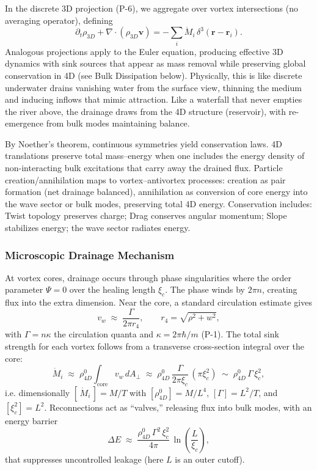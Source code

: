 In the discrete 3D projection (P-6), we aggregate over vortex intersections (no averaging operator), defining
\begin{equation}
\partial_t \rho_{3D} + \nabla \!\cdot (\rho_{3D}\mathbf{v}) = -\sum_i \dot{M}_i\,\delta^3(\mathbf{r}-\mathbf{r}_i).
\end{equation}
Analogous projections apply to the Euler equation, producing effective 3D dynamics with sink sources that appear as mass removal while preserving global conservation in 4D (see Bulk Dissipation below). Physically, this is like discrete underwater drains vanishing water from the surface view, thinning the medium and inducing inflows that mimic attraction. Like a waterfall that never empties the river above, the drainage draws from the 4D structure (reservoir), with re-emergence from bulk modes maintaining balance.

By Noether's theorem, continuous symmetries yield conservation laws. 4D translations preserve total mass–energy when one includes the energy density of non-interacting bulk excitations that carry away the drained flux. Particle creation/annihilation maps to vortex–antivortex processes: creation as pair formation (net drainage balanced), annihilation as conversion of core energy into the wave sector or bulk modes, preserving total 4D energy. Conservation includes: Twist topology preserves charge; Drag conserves angular momentum; Slope stabilizes energy; the wave sector radiates energy.

\subsubsection{Microscopic Drainage Mechanism}
At vortex cores, drainage occurs through phase singularities where the order parameter $\Psi=0$ over the healing length $\xi_c$. The phase winds by $2\pi n$, creating flux into the extra dimension. Near the core, a standard circulation estimate gives
\begin{equation}
v_w \;\approx\; \frac{\Gamma}{2\pi r_4},\qquad r_4=\sqrt{\rho^2+w^2},
\end{equation}
with $\Gamma=n\kappa$ the circulation quanta and $\kappa=2\pi\hbar/m$ (P-1). The total sink strength for each vortex follows from a transverse cross-section integral over the core:
\begin{equation}
\dot M_i \;\approx\; \rho_{4D}^0 \int_{\text{core}} v_w\, dA_\perp
\;\approx\; \rho_{4D}^0\,\frac{\Gamma}{2\pi \xi_c}\,(\pi \xi_c^2)
\;\sim\; \rho_{4D}^0\,\Gamma\,\xi_c^2,
\end{equation}
i.e. dimensionally $[\,\dot M_i\,]=M/T$ with $[\rho_{4D}^0]=M/L^4$, $[\Gamma]=L^2/T$, and $[\xi_c^2]=L^2$. Reconnections act as ``valves,'' releasing flux into bulk modes, with an energy barrier
\begin{equation}
\Delta E \;\approx\; \frac{\rho_{4D}^0\,\Gamma^2\,\xi_c^2}{4\pi}\,\ln\!\left(\frac{L}{\xi_c}\right),
\end{equation}
that suppresses uncontrolled leakage (here $L$ is an outer cutoff).

